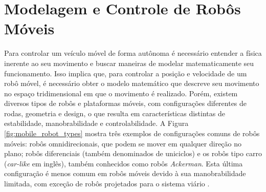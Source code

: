 

\section{Modelagem e Controle de Robôs Móveis}

Para controlar um veículo móvel de forma autônoma é necessário entender a física inerente ao seu movimento e buscar maneiras de modelar matematicamente seu funcionamento. Isso implica que, para controlar a posição e velocidade de um robô móvel, é necessário obter o modelo matemático que descreve seu movimento no espaço tridimensional em que o movimento é realizado. Porém, existem diversos tipos de robôs e plataformas móveis, com configurações diferentes de rodas, geometria e design, o que resulta em características distintas de estabilidade, manobrabilidade e controlabilidade. A Figura \ref{fig:mobile_robot_types} mostra três exemplos de configurações comuns de robôs móveis: robôs omnidirecionais, que podem se mover em qualquer direção no plano; robôs diferenciais (também denominados de uniciclos) e os robôs tipo carro (\textit{car-like} em inglês), também conhecidos como robôs \textit{Ackerman}. Esta última configuração é menos comum em robôs móveis devido à sua manobrabilidade limitada, com exceção de robôs projetados para o sistema viário \cite{book:siegwart2011}.


